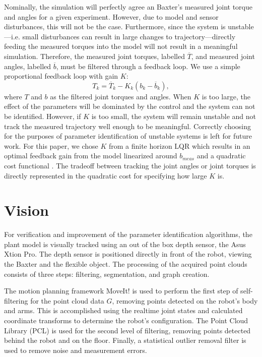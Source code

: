 \documentclass[runningheads,a4paper]{llncs}
\begin{document}
Nominally, the simulation will perfectly agree an Baxter's measured joint torque and angles for a given experiment. However, due to model and sensor disturbances, this will not be the case. Furthermore, since the system is unstable---i.e. small disturbances can result in large changes to trajectory---directly feeding the measured torques into the model will not result in a meaningful simulation. Therefore, the measured joint torques, labelled $\overline{T}$, and measured joint angles, labelled $\overline{b}$, must be filtered through a feedback loop. We use a simple proportional feedback loop with gain $K$: 
\[
T_k = \overline{T}_k - K_k (b_k - \overline{b}_k),
\]
where $T$ and $b$ as the filtered joint torques and angles.  When $K$ is too large, the effect of the parameters will be dominated by the control and the system can not be identified. However, if $K$ is too small, the system will remain unstable and not track the measured trajectory well enough to be meaningful.  Correctly choosing for the purposes of parameter identification of unstable systems is left for future work.  For this paper, we chose $K$ from a finite horizon LQR which results in an optimal feedback gain from the model linearized around $b_{meas}$ and a quadratic cost functional \cite{anderson_moore}.  The tradeoff between tracking the joint angles or joint torques is directly represented in the quadratic cost for specifying how large $K$ is.


\section{Vision}
\label{sec-vis}
For verification and improvement of the parameter identification algorithms, the plant model is visually tracked using an out of the box depth sensor, the Asus Xtion Pro. The depth sensor is positioned directly in front of the robot, viewing the Baxter and the flexible object. The processing of the acquired point clouds consists of three steps: filtering, segmentation, and graph creation. 

The motion planning framework MoveIt! \cite{moveit} is used to perform the first step of self-filtering for the point cloud data $G$, removing points detected on the robot’s body and arms. This is accomplished using the realtime joint states and calculated coordinate transforms to determine the robot’s configuration. The Point Cloud Library (PCL) \cite{rusu20113d} is used for the second level of filtering, removing points detected behind the robot and on the floor. Finally, a statistical outlier removal filter is used to remove noise and measurement errors.
\end{document}
